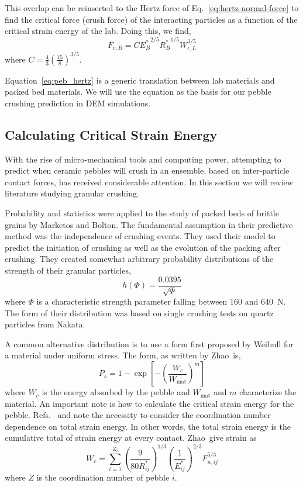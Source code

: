 This overlap can be reinserted to the Hertz force of Eq.~\ref{eq:hertz-normal-force} to find the critical force (crush force) of the interacting particles as a function of the critical strain energy of the lab. Doing this, we find,
\begin{equation}\label{eq:peb_hertz}
	F_{c,B} = C{E_B^*}^{2/5}{R_B^*}^{1/5}W_{\epsilon,L}^{3/5}
\end{equation}
where $C = \frac{4}{3}\left(\frac{15}{8}\right)^{3/5}$.

Equation~\ref{eq:peb_hertz} is a generic translation between lab materials and packed bed materials. We will use the equation as the basis for our pebble crushing prediction in DEM simulations.





\subsection{Calculating Critical Strain Energy}
With the rise of micro-mechanical tools and computing power, attempting to predict when ceramic pebbles will crush in an ensemble, based on inter-particle contact forces, has received considerable attention. In this section we will review literature studying granular crushing.

Probability and statistics were applied to the study of packed beds of brittle grains by Marketos and Bolton\cite{Marketos2007}. The fundamental assumption in their predictive method was the independence of crushing events. They used their model to predict the initiation of crushing as well as the evolution of the packing after crushing. They created somewhat arbitrary probability distributions of the strength of their granular particles,
\begin{equation}
	h(\Phi) = \frac{0.0395}{\sqrt{\Phi}}
\end{equation}
where $\Phi$ is a characteristic strength parameter falling between 160 and 640~N. The form of their distribution was based on single crushing tests on quartz particles from Nakata\etal.

A common alternative distribution is to use a form first proposed by Weibull for a material under uniform stress\cite{Kwok2013,Zhao2011,nakata1999probabilistic,Zhao2013,Pitchumani2004}. The form, as written by Zhao\etal~is,
\begin{equation}
	P_s = 1 - \exp\left[-\left(\frac{W_c}{W_\text{mat}}\right)^m\right]
\end{equation}
where $W_c$ is the energy absorbed by the pebble and $W_\text{mat}$ and $m$ characterize the material. An important note is how to calculate the critical strain energy for the pebble. Refs.~\cite{Marketos2007} and \cite{Zhao2011} note the necessity to consider the coordination number dependence on total strain energy. In other words, the total strain energy is the cumulative total of strain energy at every contact. Zhao\etal~give strain as
\begin{equation}
	W_c = \sum_{i=1}^{Z_i}\left(\frac{9}{80 R_{ij}^*}\right)^{1/3} \left(\frac{1}{E_{ij}^*}\right)^{2/3} F_{n,ij}^{5/3}
\end{equation}
where $Z$ is the coordination number of pebble $i$. 

